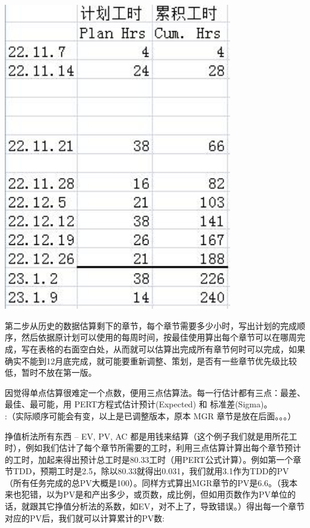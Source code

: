 
\includegraphics[width=10cm]{psp3.jpg}

第二步从历史的数据估算剩下的章节，每个章节需要多少小时，写出计划的完成顺序，然后依据原计划可以使用的每周时间，按最佳使用算出每个章节可以在哪周完成，写在表格的右面空白处，从而就可以估算出完成所有章节何时可以完成，如果确实不能到12月底完成，就可能要重新调整、策划，是否有一些章节优先级比较低，暂时不放在第一版。

因觉得单点估算很难定一个点数，便用三点估算法。每一行估计都有三点：最差、最佳、最可能，用
PERT方程式估计预计(Expected) 和 标准差(Sigma)。\\
:（实际顺序可能会有变，以上是已调整版本，原本 MGR 章节是放在后面。。。）

挣值析法所有东西 -- EV, PV, AC
都是用钱来结算（这个例子我们就是用所花工时），例如我们估计了每个章节所需要的工时，利用三点估算计算出每个章节预计的工时，加起来得出预计总工时是80.33工时（用PERT公式计算）。例如第一个章节TDD，预期工时是2.5，除以80.33就得出0.031，我们就用3.1作为TDD的PV（所有任务完成的总PV大概是100）。同样方式算出MGR章节的PV是6.6。（我本来也犯错，以为PV是和产出多少，或页数，成比例，但如用页数作为PV单位的话，就跟其它挣值分析法的系数，如EV，对不上了，导致错误。）得出每一个章节对应的PV后，我们就可以计算累计的PV数:



